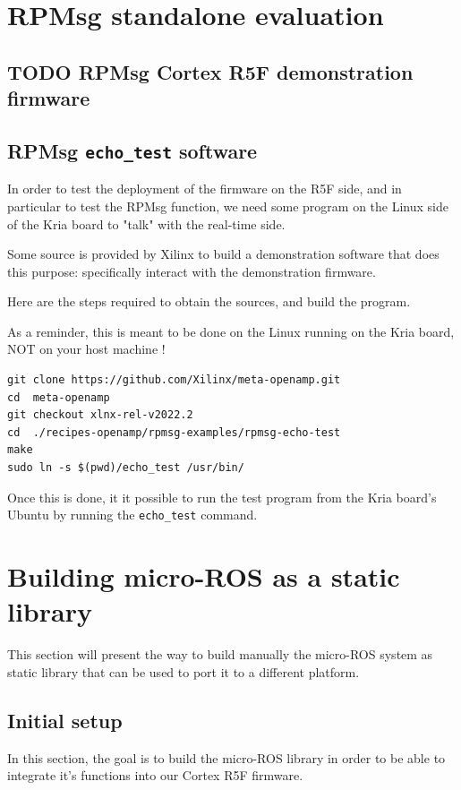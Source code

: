 \documentclass[10pt]{article}
\begin{document}
\section{RPMsg standalone evaluation}
\label{sec:org4559868}
\subsection{{\bfseries\sffamily TODO} RPMsg Cortex R5F demonstration firmware}
\label{sec:org6267721}
\subsection{RPMsg \texttt{echo\_test} software}
\label{sec:org9eb1a50}
In order to test the deployment of the firmware on the R5F side, and in particular
to test the RPMsg function, we need some program on the Linux side of the Kria
board to "talk" with the real-time side.

Some source is provided by Xilinx to build a demonstration software that does
this purpose: specifically interact with the demonstration firmware.

Here are the steps required to obtain the sources, and build the program.

As a reminder, this is meant to be done on the Linux running on the
Kria board, NOT on your host machine !

\begin{verbatim}
git clone https://github.com/Xilinx/meta-openamp.git
cd  meta-openamp
git checkout xlnx-rel-v2022.2
cd  ./recipes-openamp/rpmsg-examples/rpmsg-echo-test
make
sudo ln -s $(pwd)/echo_test /usr/bin/
\end{verbatim}

Once this is done, it it possible to run the test program from the Kria board's Ubuntu
by running the \texttt{echo\_test} command.

\clearpage
\section{Building micro-ROS as a static library}
\label{sec:org3b3c596}
This section will present the way to build manually the micro-ROS system as static library
that can be used to port it to a different platform.

\subsection{Initial setup}
\label{sec:orgb487497}
In this section, the goal is to build the micro-ROS library in order to be
able to integrate it's functions into our Cortex R5F firmware.
\end{document}
